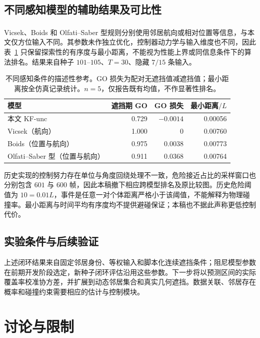 \documentclass[UTF8,fontset=windows,11pt]{ctexart}
\newcommand{\upcite}[1]{\textsuperscript{\cite{#1}}}
\begin{document}
\subsection{不同感知模型的辅助结果及可比性}

Vicsek、Boids 和 Olfati--Saber 型规则分别使用邻居航向或相对位置等信息\upcite{Vicsek1995,Reynolds1987,OlfatiSaber2006}，与本文仅方位输入不同。其参数未作独立优化，控制器动力学与输入维度也不同，因此表~\ref{tab:mainstream} 只保留探索性的有序度与最小距离，不能视为性能上界或同信息条件下的算法排名。结果来自种子 $101$--$105$、$T=30$、隐藏 $7/15$ 条输入。

\begin{table}[!tbp]
\centering\small
\caption{不同感知条件的描述性参考。GO 损失为配对无遮挡值减遮挡值；最小距离按全仿真记录统计。$n=5$，仅报告既有均值，不作显著性排名。}
\label{tab:mainstream}
\begin{tabular}{lrrr}
\toprule 模型 & 遮挡期 GO & GO 损失 & 最小距离$/L$\\\midrule
本文 KF-unc & 0.729 & $-0.0014$ & 0.00056\\
Vicsek（航向） & 1.000 & 0 & 0.00760\\
Boids（位置与航向） & 0.975 & 0.0038 & 0.00773\\
Olfati--Saber 型（位置与航向） & 0.911 & 0.0368 & 0.00764\\\bottomrule
\end{tabular}
\end{table}

历史实现的控制努力存在单位与角度回绕处理不一致，危险接近占比的采样窗口也分别包含 $601$ 与 $600$ 帧，因此本稿撤下相应跨模型排名及原比较图。历史危险阈值为 $10=0.01L$，事件是任意一对个体距离严格小于该阈值，不能解释为物理碰撞率。最小距离与时间平均有序度均不提供避碰保证；本稿也不据此声称更低控制代价。

\subsection{实验条件与后续验证}

上述闭环结果来自固定邻居身份、等权输入和脚本化连续遮挡条件；阻尼模型参数在前期开发阶段选定，新种子闭环评估沿用这些参数。下一步将以预测区间的实际覆盖率校准协方差，并扩展到动态邻居集合和真实几何遮挡。数据关联、邻居存在概率和碰撞约束需要相应的估计与控制模块。

\section{讨论与限制}
\end{document}
